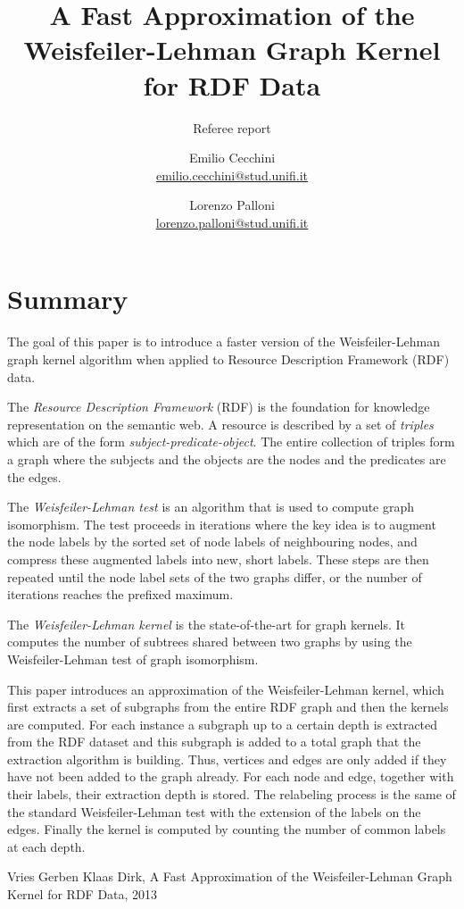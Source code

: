 \documentclass[12pt]{scrartcl}
\begin{document}
\title{A Fast Approximation of the Weisfeiler-Lehman Graph Kernel for RDF Data}
\subtitle{Referee report}
\author{
Emilio Cecchini \\ \href{mailto:emilio.cecchini@stud.unifi.it}{emilio.cecchini@stud.unifi.it}
\and
Lorenzo Palloni \\ \href{mailto:lorenzo.palloni@stud.unifi.it}{lorenzo.palloni@stud.unifi.it}
}

\maketitle

\section{Summary}

The goal of this paper is to introduce a faster version of the Weisfeiler-Lehman graph kernel algorithm when applied to Resource Description Framework (RDF) data.

The \textit{Resource Description Framework} (RDF) is the foundation for knowledge representation on the semantic web. A resource is described by a set of \textit{triples} which are of the form \textit{subject-predicate-object}. The entire collection of triples form a graph where the subjects and the objects are the nodes and the predicates are the edges.

The \textit{Weisfeiler-Lehman test} is an algorithm that is used to compute graph isomorphism. The test proceeds in iterations where the key idea is to augment the node labels by the sorted set of node labels of neighbouring nodes, and compress these augmented labels into new, short labels. These steps are then repeated until the node label sets of the two graphs differ, or the number of iterations reaches the prefixed maximum.

The \textit{Weisfeiler-Lehman kernel} is the state-of-the-art for graph kernels. It computes the number of subtrees shared between two graphs by using the Weisfeiler-Lehman test of graph isomorphism.

This paper introduces an approximation of the Weisfeiler-Lehman kernel, which first extracts a set of subgraphs from the entire RDF graph and then the kernels are computed. For each instance a subgraph up to a certain depth is extracted from the RDF dataset and this subgraph is added to a total graph that the extraction algorithm is building. Thus, vertices and edges are only added if they have not been added to the graph already. For each node and edge, together with their labels, their extraction depth is stored. The relabeling process is the same of the standard Weisfeiler-Lehman test with the extension of the labels on the edges. Finally the kernel is computed by counting the number of common labels at each depth.

\begin{thebibliography}{9}

    Vries Gerben Klaas Dirk,
    A Fast Approximation of the Weisfeiler-Lehman Graph Kernel for RDF Data,
    2013

\end{thebibliography}
\end{document}
